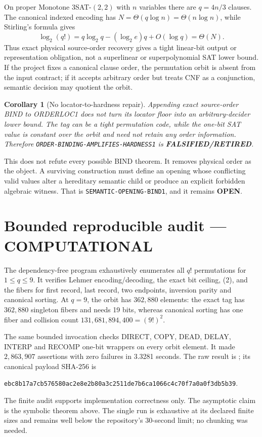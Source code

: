 \documentclass[11pt]{article}
\newcommand{\COMP}{\textbf{COMPUTATIONAL}}
\newcommand{\OPEN}{\textbf{OPEN}}
\newcommand{\RETIRED}{\textbf{FALSIFIED/RETIRED}}
\newtheorem{corollary}{Corollary}
\begin{document}
On proper Monotone $3$SAT-$(2,2)$ with $n$ variables there are
$q=4n/3$ clauses.  The canonical indexed encoding has
$N=\Theta(q\log n)=\Theta(n\log n)$, while Stirling's formula gives
\begin{equation}
 \log_2(q!)=q\log_2 q-(\log_2 e)q+O(\log q)=\Theta(N).          \tag{3}
\end{equation}
Thus exact physical source-order recovery gives a tight linear-bit output or
representation obligation, not a superlinear or superpolynomial SAT lower
bound.  If the project fixes a canonical clause order, the permutation orbit
is absent from the input contract; if it accepts arbitrary order but treats
CNF as a conjunction, semantic decision may quotient the orbit.

\begin{corollary}[No locator-to-hardness repair]
Appending exact source-order BIND to ORDERLOC1 does not turn its locator floor
into an arbitrary-decider lower bound.  The tag can be a tight permutation
code, while the one-bit SAT value is constant over the orbit and need not
retain any order information.  Therefore
\texttt{ORDER-BINDING-AMPLIFIES-HARDNESS1} is \RETIRED.
\end{corollary}

This does not refute every possible BIND theorem.  It removes physical order
as the object.  A surviving construction must define an opening whose
conflicting valid values alter a hereditary semantic child or produce an
explicit forbidden algebraic witness.  That is
\texttt{SEMANTIC-OPENING-BIND1}, and it remains \OPEN.

\section{Bounded reproducible audit --- \COMP}

The dependency-free program
 exhaustively enumerates
all $q!$ permutations for $1\le q\le9$.  It verifies Lehmer
encoding/decoding, the exact bit ceiling, (2), and the fibers for first record,
last record, two endpoints, inversion parity and canonical sorting.  At
$q=9$, the orbit has $362{,}880$ elements: the exact tag has $362{,}880$
singleton fibers and needs 19 bits, whereas canonical sorting has one fiber
and collision count $131{,}681{,}894{,}400=(9!)^2$.

The same bounded invocation checks DIRECT, COPY, DEAD, DELAY, INTERP and
RECOMP one-bit wrappers on every orbit element.  It made $2{,}863{,}907$
assertions with zero failures in 3.3281 seconds.  The raw result is
; its canonical
payload SHA-256 is
\begin{center}
\texttt{ebc8b17a7cb576580ac2e8e2b80a3c2511de7b6ca1066c4c70f7a0a0f3db5b39}.
\end{center}
The finite audit supports implementation correctness only.  The asymptotic
claim is the symbolic theorem above.  The single run is exhaustive at its
declared finite sizes and remains well below the repository's 30-second
limit; no chunking was needed.
\end{document}
